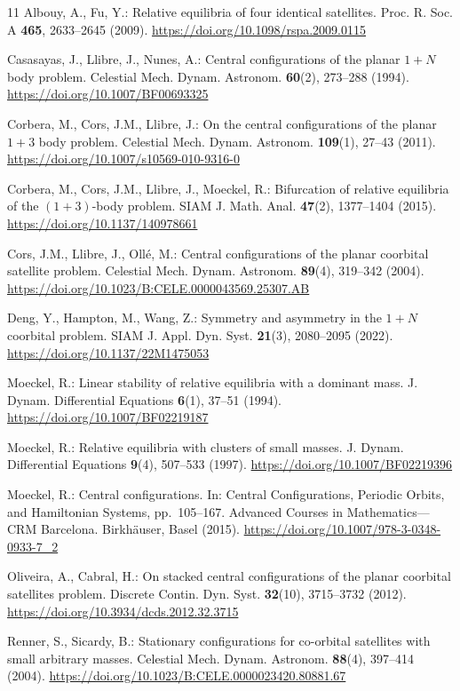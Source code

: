 \documentclass[11pt,a4paper]{article}
\numberwithin{equation}{section}
\theoremstyle{remark}
\begin{document}
\begin{thebibliography}{11}
\setlength{\itemsep}{2pt}
\setlength{\parsep}{0pt}
Albouy, A., Fu, Y.: Relative equilibria of four identical satellites.
Proc. R. Soc. A \textbf{465}, 2633--2645 (2009).
\url{https://doi.org/10.1098/rspa.2009.0115}

Casasayas, J., Llibre, J., Nunes, A.: Central configurations of the planar $1+N$ body problem.
Celestial Mech. Dynam. Astronom. \textbf{60}(2), 273--288 (1994).
\url{https://doi.org/10.1007/BF00693325}

Corbera, M., Cors, J.M., Llibre, J.: On the central configurations of the planar $1+3$ body problem.
Celestial Mech. Dynam. Astronom. \textbf{109}(1), 27--43 (2011).
\url{https://doi.org/10.1007/s10569-010-9316-0}

Corbera, M., Cors, J.M., Llibre, J., Moeckel, R.: Bifurcation of relative equilibria of the $(1+3)$-body problem.
SIAM J. Math. Anal. \textbf{47}(2), 1377--1404 (2015).
\url{https://doi.org/10.1137/140978661}

Cors, J.M., Llibre, J., Oll\'e, M.: Central configurations of the planar coorbital satellite problem.
Celestial Mech. Dynam. Astronom. \textbf{89}(4), 319--342 (2004).
\url{https://doi.org/10.1023/B:CELE.0000043569.25307.AB}

Deng, Y., Hampton, M., Wang, Z.: Symmetry and asymmetry in the $1+N$ coorbital problem.
SIAM J. Appl. Dyn. Syst. \textbf{21}(3), 2080--2095 (2022).
\url{https://doi.org/10.1137/22M1475053}

Moeckel, R.: Linear stability of relative equilibria with a dominant mass.
J. Dynam. Differential Equations \textbf{6}(1), 37--51 (1994).
\url{https://doi.org/10.1007/BF02219187}

Moeckel, R.: Relative equilibria with clusters of small masses.
J. Dynam. Differential Equations \textbf{9}(4), 507--533 (1997).
\url{https://doi.org/10.1007/BF02219396}

Moeckel, R.: Central configurations. In: Central Configurations, Periodic Orbits, and Hamiltonian Systems,
pp.~105--167. Advanced Courses in Mathematics---CRM Barcelona.
Birkh\"auser, Basel (2015).
\url{https://doi.org/10.1007/978-3-0348-0933-7_2}

Oliveira, A., Cabral, H.: On stacked central configurations of the planar coorbital satellites problem.
Discrete Contin. Dyn. Syst. \textbf{32}(10), 3715--3732 (2012).
\url{https://doi.org/10.3934/dcds.2012.32.3715}

Renner, S., Sicardy, B.: Stationary configurations for co-orbital satellites with small arbitrary masses.
Celestial Mech. Dynam. Astronom. \textbf{88}(4), 397--414 (2004).
\url{https://doi.org/10.1023/B:CELE.0000023420.80881.67}
\end{thebibliography}
\end{document}
